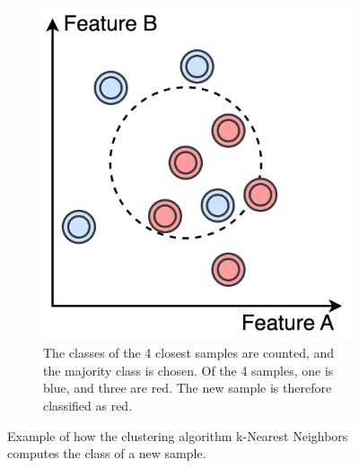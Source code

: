 \begin{figure}[htb]
{\begin{subfigure}[b]{0.37\textwidth}
             \end{subfigure}
             \hspace{0.015\textwidth}
             \begin{subfigure}[b]{0.37\textwidth}
                 \centering
                 \includegraphics[width=\textwidth]{images/knn_3.png}
                 \caption{The classes of the 4 closest samples are counted, and the majority class is chosen. Of the 4 samples, one is blue, and three are red. The new sample is therefore classified as red.} 
             \end{subfigure}
             }
            \caption{Example of how the clustering algorithm k-Nearest Neighbors computes the class of a new sample. 
            }
            \label{fig:knn}
        \end{figure}
        

